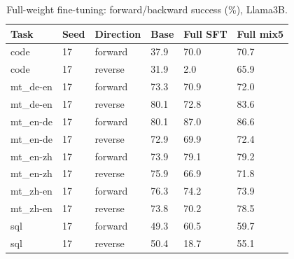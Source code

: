 \begin{table}[t]
\centering\small
\begin{tabular}{llllll}
\toprule
Task & Seed & Direction & Base & Full SFT & Full mix5 \\
\midrule
code & 17 & forward & 37.9 & 70.0 & 70.7 \\
code & 17 & reverse & 31.9 & 2.0 & 65.9 \\
mt\_de-en & 17 & forward & 73.3 & 70.9 & 72.0 \\
mt\_de-en & 17 & reverse & 80.1 & 72.8 & 83.6 \\
mt\_en-de & 17 & forward & 80.1 & 87.0 & 86.6 \\
mt\_en-de & 17 & reverse & 72.9 & 69.9 & 72.4 \\
mt\_en-zh & 17 & forward & 73.9 & 79.1 & 79.2 \\
mt\_en-zh & 17 & reverse & 75.9 & 66.9 & 71.8 \\
mt\_zh-en & 17 & forward & 76.3 & 74.2 & 73.9 \\
mt\_zh-en & 17 & reverse & 73.8 & 70.2 & 78.5 \\
sql & 17 & forward & 49.3 & 60.5 & 59.7 \\
sql & 17 & reverse & 50.4 & 18.7 & 55.1 \\
\bottomrule
\end{tabular}
\caption{Full-weight fine-tuning: forward/backward success (\%), Llama3B.}
\label{tab:fullft-snapshot}
\end{table}
